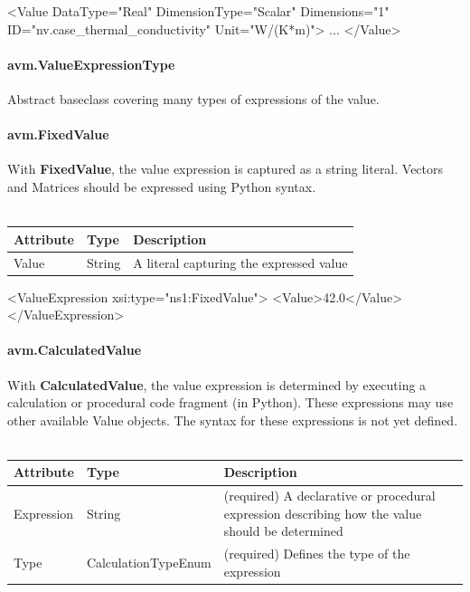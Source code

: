 \begin{MyVerbatim}[frame=single]
    <Value 
      DataType="Real" 
      DimensionType="Scalar" 
      Dimensions="1" 
      ID="nv.case_thermal_conductivity" 
      Unit="W/(K*m)">
    ...
    </Value>
\end{MyVerbatim}

\paragraph{avm.ValueExpressionType}
\label{ValueExpressionType}
Abstract baseclass covering many types of expressions of the value.

\paragraph{avm.FixedValue}
With \textbf{FixedValue}, the value expression is captured as a string literal. Vectors and Matrices should be expressed using Python syntax.
\\ \\
\begin{tabular}{ l l p{7cm} }
\textbf{Attribute} & \textbf{Type} & \textbf{Description} \\ \hline
Value & String & A literal capturing the expressed value \\ \hline
\end{tabular}

\begin{MyVerbatim}[frame=single]
     <ValueExpression xsi:type="ns1:FixedValue">
        <Value>42.0</Value>
     </ValueExpression>
\end{MyVerbatim}

\paragraph{avm.CalculatedValue}
With \textbf{CalculatedValue}, the value expression is determined by executing a calculation or procedural code fragment (in Python). These expressions may use other available Value objects. The syntax for these expressions is not yet defined.
\\ \\
\begin{tabular}{ l l p{10cm} }
\textbf{Attribute} & \textbf{Type} & \textbf{Description} \\ \hline
Expression & String & (required) A declarative or procedural expression describing how the value should be determined \\ \hline
Type & CalculationTypeEnum & (required) Defines the type of the expression \\ \hline
\end{tabular}

